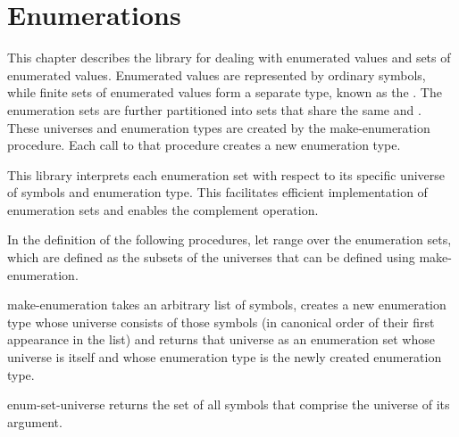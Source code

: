 \chapter{Enumerations}
\label{enumerationschapter}

This chapter describes the  library for dealing with enumerated values
and sets of enumerated values.  Enumerated
values are represented by ordinary symbols, while finite sets of
enumerated values form a separate type, known as the
.
The enumeration sets are further partitioned into sets that
share the same  and .
These universes and enumeration types are created by the
{\cf make-enumeration} procedure.  Each call to that procedure
creates a new enumeration type.

This library interprets each enumeration set with respect to
its specific universe of symbols and enumeration type.
This facilitates efficient implementation of enumeration sets
and enables the complement operation.

In the definition of the following procedures, let 
range over the enumeration sets, which are defined as the subsets
of the universes that can be defined using {\cf make-enumeration}.

\begin{entry}{%
}

{\cf make-enumeration} takes an arbitrary list of symbols,
creates a new enumeration type whose universe consists of
those symbols (in canonical order of their first appearance
in the list) and returns that universe as an enumeration
set whose universe is itself and whose enumeration type is
the newly created enumeration type.
\end{entry}

\begin{entry}{%
}

{\cf enum-set-universe} returns the set of all symbols that comprise
the universe of its argument.
\end{entry}

